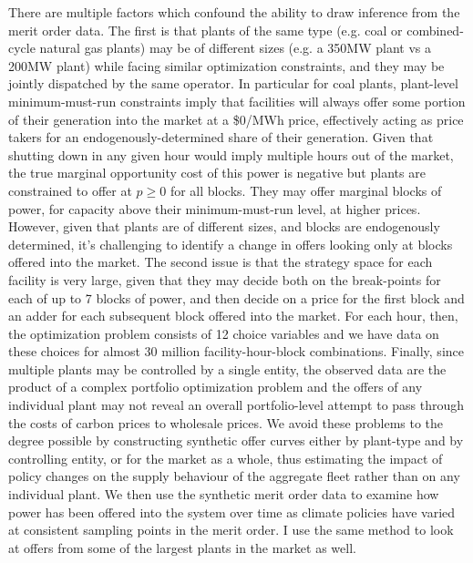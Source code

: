 \documentclass[12pt]{article}
\begin{document}
There are multiple factors which confound the ability to draw inference from the merit order data. The first is that plants of the same type (e.g. coal or combined-cycle natural gas plants) may be of different sizes (e.g. a 350MW plant vs a 200MW plant) while facing similar optimization constraints, and they may be jointly dispatched by the same operator. In particular for coal plants, plant-level minimum-must-run constraints imply that facilities will always offer some portion of their generation into the market at a \$0/MWh price, effectively acting as price takers for an endogenously-determined share of their generation. Given that shutting down in any given hour would imply multiple hours out of the market, the true marginal opportunity cost of this power is negative but plants are constrained to offer at $p\geq0$ for all blocks. They may offer marginal blocks of power, for capacity above their minimum-must-run level, at higher prices. However, given that plants are of different sizes, and blocks are endogenously determined, it's challenging to identify a change in offers looking only at blocks offered into the market. The second issue is that the strategy space for each facility is very large, given that they may decide both on the break-points for each of up to 7 blocks of power, and then decide on a price for the first block and an adder for each subsequent block offered into the market. For each hour, then, the optimization problem consists of 12 choice variables and we have data on these choices for almost 30 million facility-hour-block combinations. Finally, since multiple plants may be controlled by a single entity, the observed data are the product of a complex portfolio optimization problem and the offers of any individual plant may not reveal an overall portfolio-level attempt to pass through the costs of carbon prices to wholesale prices. We avoid these problems to the degree possible by constructing synthetic offer curves either by plant-type and by controlling entity, or for the market as a whole, thus estimating the impact of policy changes on the supply behaviour of the aggregate fleet rather than on any individual plant. We then use the synthetic merit order data to examine how power has been offered into the system over time as climate policies have varied at consistent sampling points in the merit order. I use the same method to look at offers from some of the largest plants in the market as well.
\end{document}
